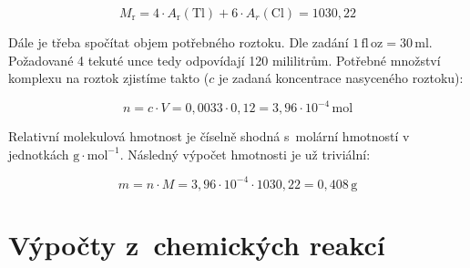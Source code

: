 \documentclass{book}
\begin{document}
\[
M_{\mathrm{r}}=4\cdot A_\mathrm{r}(\mathrm{Tl})+6\cdot A_{r}(\mathrm{Cl})=1030,22
\]

Dále je třeba spočítat objem potřebného roztoku. Dle zadání $1\,\mathrm{fl\,oz=30\,ml}$.
Požadované 4 tekuté unce tedy odpovídají 120 mililitrům. Potřebné
množství komplexu na roztok zjistíme takto ($c$ je zadaná koncentrace
nasyceného roztoku):

\[
n=c\cdot V=0,0033\cdot0,12=3,96\cdot10^{-4}\,\mathrm{mol}
\]

Relativní molekulová hmotnost je číselně shodná s~molární hmotností
v jednotkách $\mathrm{g\cdot mol^{-1}}$. Následný výpočet hmotnosti
je už triviální:

\[
m=n\cdot M=3,96\cdot10^{-4}\cdot1030,22=0,408\,\mathrm{g}
\]


\section{Výpočty z~chemických reakcí}
\end{document}
